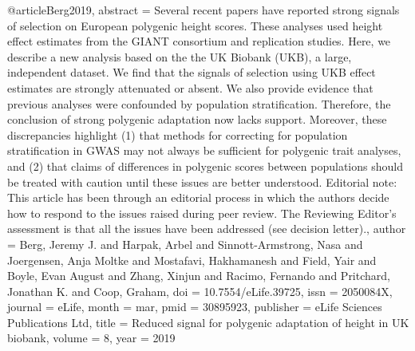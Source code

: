 @article{Berg2019,
abstract = {Several recent papers have reported strong signals of selection on European polygenic height scores. These analyses used height effect estimates from the GIANT consortium and replication studies. Here, we describe a new analysis based on the the UK Biobank (UKB), a large, independent dataset. We find that the signals of selection using UKB effect estimates are strongly attenuated or absent. We also provide evidence that previous analyses were confounded by population stratification. Therefore, the conclusion of strong polygenic adaptation now lacks support. Moreover, these discrepancies highlight (1) that methods for correcting for population stratification in GWAS may not always be sufficient for polygenic trait analyses, and (2) that claims of differences in polygenic scores between populations should be treated with caution until these issues are better understood. Editorial note: This article has been through an editorial process in which the authors decide how to respond to the issues raised during peer review. The Reviewing Editor's assessment is that all the issues have been addressed (see decision letter).},
author = {Berg, Jeremy J. and Harpak, Arbel and Sinnott-Armstrong, Nasa and Joergensen, Anja Moltke and Mostafavi, Hakhamanesh and Field, Yair and Boyle, Evan August and Zhang, Xinjun and Racimo, Fernando and Pritchard, Jonathan K. and Coop, Graham},
doi = {10.7554/eLife.39725},
issn = {2050084X},
journal = {eLife},
month = {mar},
pmid = {30895923},
publisher = {eLife Sciences Publications Ltd},
title = {{Reduced signal for polygenic adaptation of height in UK biobank}},
volume = {8},
year = {2019}
}
